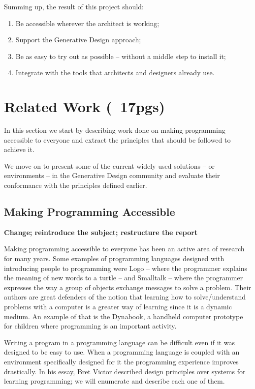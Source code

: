 \documentclass{./llncs2e/llncs}
\begin{document}
	Summing up, the result of this project should:
	\begin{enumerate}
		\item Be accessible wherever the architect is working; \label{obj:access}
		\item Support the Generative Design approach; \label{obj:gen-design}
		\item Be as easy to try out as possible -- without a middle step to install it; \label{obj:no-install}
		\item Integrate with the tools that architects and designers already use.\label{obj:inter-op}
	\end{enumerate}


\section{Related Work (~17pgs)}
	In this section we start by describing work done on making programming accessible to everyone and extract the principles that should be followed to achieve it.

	We move on to present some of the current widely used solutions -- or environments -- in the Generative Design community and evaluate their conformance with the principles defined earlier.

\subsection{Making Programming Accessible}
	\textbf{Change; reintroduce the subject; restructure the report}

	Making programming accessible to everyone has been an active area of research for many years. 
	Some examples of programming languages designed with introducing people to programming were Logo\cite{papert1999logo} -- where the programmer explains the meaning of new words to a turtle -- and Smalltalk\cite{goldberg1983smalltalk} -- where the programmer expresses the way a group of objects exchange messages to solve a problem. 
	Their authors are great defenders of the notion that learning how to solve/understand problems with a computer is a greater way of learning since it is a dynamic medium. 
	An example of that is the Dynabook\cite{Kay:2011:PCC:800193.1971922}, a handheld computer prototype for children where programming is an important activity.

	Writing a program in a programming language can be difficult even if it was designed to be easy to use. 
	When a programming language is coupled with an environment specifically designed for it the programming experience improves drastically. 
	In his essay\cite{victor2012learnable}, Bret Victor described design principles over systems for learning programming; we will enumerate and describe each one of them.
\end{document}
